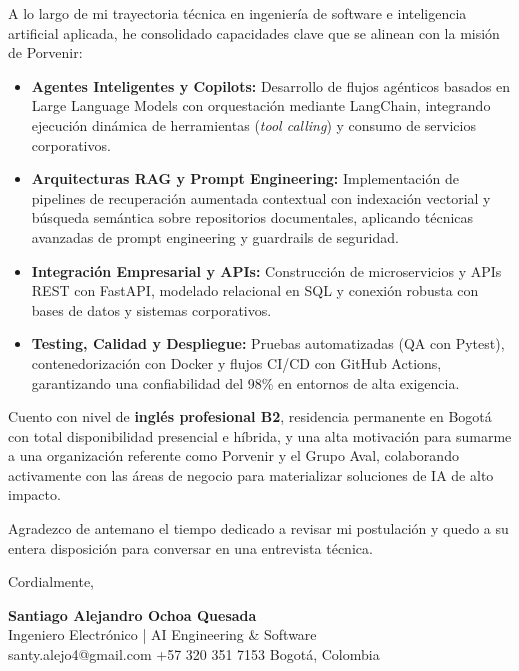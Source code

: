 \documentclass[11pt,a4paper]{article}
\begin{document}
A lo largo de mi trayectoria técnica en ingeniería de software e inteligencia artificial aplicada, he consolidado capacidades clave que se alinean con la misión de Porvenir:

\begin{itemize}[label={\color{accentblue}\raisebox{0.2ex}{\tiny\faCircle}}, leftmargin=1.4em, itemsep=3pt, parsep=0pt, topsep=2pt]
    \item \textbf{Agentes Inteligentes y Copilots:} Desarrollo de flujos agénticos basados en Large Language Models con orquestación mediante LangChain, integrando ejecución dinámica de herramientas (\textit{tool calling}) y consumo de servicios corporativos.
    \item \textbf{Arquitecturas RAG y Prompt Engineering:} Implementación de pipelines de recuperación aumentada contextual con indexación vectorial y búsqueda semántica sobre repositorios documentales, aplicando técnicas avanzadas de prompt engineering y guardrails de seguridad.
    \item \textbf{Integración Empresarial y APIs:} Construcción de microservicios y APIs REST con FastAPI, modelado relacional en SQL y conexión robusta con bases de datos y sistemas corporativos.
    \item \textbf{Testing, Calidad y Despliegue:} Pruebas automatizadas (QA con Pytest), contenedorización con Docker y flujos CI/CD con GitHub Actions, garantizando una confiabilidad del 98\% en entornos de alta exigencia.
\end{itemize}

Cuento con nivel de \textbf{inglés profesional B2}, residencia permanente en Bogotá con total disponibilidad presencial e híbrida, y una alta motivación para sumarme a una organización referente como Porvenir y el Grupo Aval, colaborando activamente con las áreas de negocio para materializar soluciones de IA de alto impacto.

Agradezco de antemano el tiempo dedicado a revisar mi postulación y quedo a su entera disposición para conversar en una entrevista técnica.

\vspace{10pt}
\noindent Cordialmente,

\vspace{12pt}
\noindent
\textbf{\large\color{accent} Santiago Alejandro Ochoa Quesada}\\
{\small\color{subtletext} Ingeniero Electrónico | AI Engineering \& Software}\\
{\footnotesize\color{subtletext} santy.alejo4@gmail.com \;\textbar\; +57 320 351 7153 \;\textbar\; Bogotá, Colombia}
\end{document}

